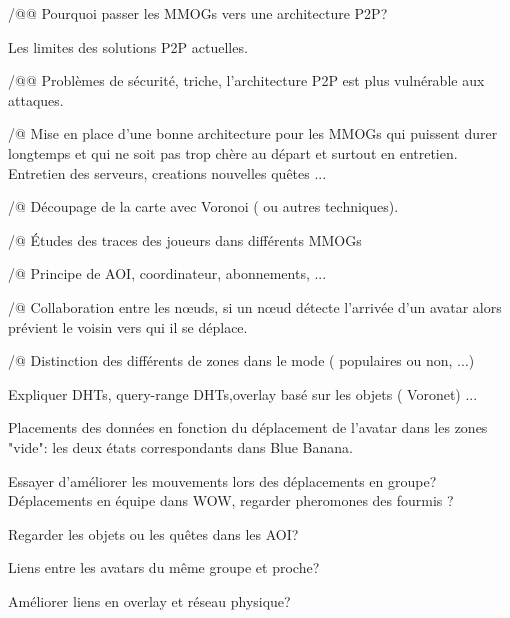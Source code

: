 /@@ Pourquoi passer les MMOGs vers une architecture P2P? 
	
Les limites des solutions P2P actuelles.

/@@ Problèmes de sécurité, triche, l'architecture P2P est plus vulnérable aux attaques.

/@ Mise en place d'une bonne architecture pour les MMOGs qui puissent durer longtemps et qui ne soit pas trop chère au départ et surtout en entretien. Entretien des serveurs, creations nouvelles quêtes ...

/@ Découpage de la carte avec Voronoi ( ou autres techniques).

/@ Études des traces des joueurs dans différents MMOGs

/@ Principe de AOI, coordinateur, abonnements, ...

/@ Collaboration entre les nœuds, si un nœud détecte l'arrivée d'un avatar alors prévient le voisin vers qui il se déplace. 

/@ Distinction des différents de zones dans le mode ( populaires ou non, ...)

Expliquer DHTs, query-range DHTs,overlay basé sur les objets ( Voronet)  ...

Placements des données en fonction du déplacement de l'avatar dans les zones "vide": les deux états correspondants dans Blue Banana.

Essayer d'améliorer les mouvements lors des déplacements en groupe? Déplacements en équipe dans WOW, regarder pheromones des fourmis ? 

Regarder les objets ou les quêtes dans les AOI?

Liens entre les avatars du même groupe et proche?  

Améliorer liens en overlay et réseau physique? 
